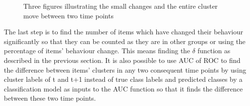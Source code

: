 \begin{figure}[!h]
	\centering
	\caption{Three figures illustrating the small changes and the entire cluster move between two time points }
	\label{fig:lable1}
\end{figure}

The last step is to find the number of items which have changed their behaviour significantly so that they can be counted as they are in other groups or using the percentage of items' behaviour change. This means finding the $\delta$ function as described in the previous section. It is also possible to use AUC of ROC to find the difference between items' clusters in any two consequent time points by using cluster labels of t and t+1 instead of true class labels and predicted classes by a classification model as inputs to the AUC function so that it finds the difference between these two time points.

